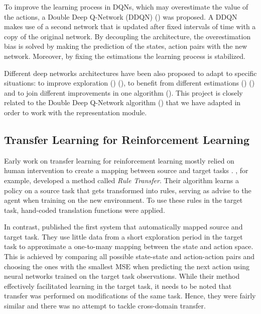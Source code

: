 To improve the learning process in DQNs, which may overestimate the value of the actions, a Double Deep Q-Network (DDQN) (\citet{DDQN}) was proposed. A DDQN makes use of a second network that is updated after fixed intervals of time with a copy of the original network. By decoupling the architecture, the overestimation bias is solved by making the prediction of the states, action pairs with the new network. Moreover, by fixing the estimations the learning process is stabilized.

Different deep networks architectures have been also proposed to adapt to specific situations: to improve exploration (\citet{noisy_dqn}) (\citet{hierarchical_dqn}), to benefit from different estimations (\citet{DuelingDQN}) (\citet{distributional_dqn}) and to join different improvements in one algorithm (\citet{rainbow}). This project is closely related to the Double Deep Q-Network algorithm (\citet{DDQN}) that we have adapted in order to work with the representation module.

\subsection{Transfer Learning for Reinforcement Learning}
Early work on transfer learning for reinforcement learning mostly relied on human intervention to create a mapping between source and target tasks \citep[e.g.][]{taylor2007cross}. \citet{taylor2007cross}, for example, developed a method called \textit{Rule Transfer}. Their algorithm learns a policy on a source task that gets transformed into rules, serving as advise to the agent when training on the new environment. To use these rules in the target task, hand-coded translation functions were applied.

In contrast, \citet{taylor2008autonomous} published the first system that automatically mapped source and target task. They use little data from a short exploration period in the target task to approximate a one-to-many mapping between the state and action space. This is achieved by comparing all possible state-state and action-action pairs and choosing the ones with the smallest MSE when predicting the next action using neural networks trained on the target task observations. While their method effectively facilitated learning in the target task, it needs to be noted that transfer was performed on modifications of the same task. Hence, they were fairly similar and there was no attempt to tackle cross-domain transfer. 

